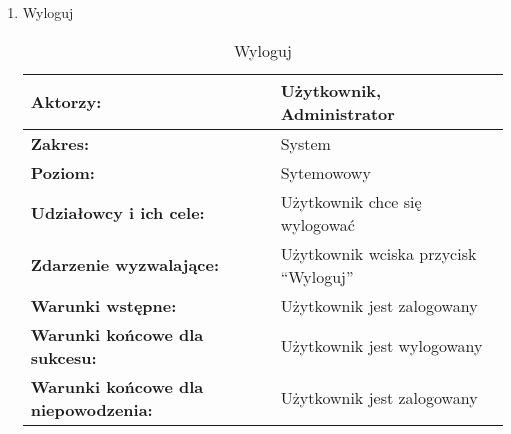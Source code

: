 \begin{enumerate}[label=(\Roman*)]
	\item Wyloguj
	\begin{table}[H]
\centering
\caption{Wyloguj}
\label{wyloguj}
\begin{tabular}{|p{7cm}|p{7cm}|}
  \hline 
  \textbf{Aktorzy:} & Użytkownik, Administrator\\
  \hline
  \textbf{Zakres:} & System \\
	\hline
  \textbf{Poziom:} & Sytemowowy \\
	\hline
  \textbf{Udziałowcy i ich cele: } & Użytkownik chce się wylogować \\
	\hline
  \textbf{Zdarzenie wyzwalające: } & Użytkownik wciska przycisk “Wyloguj” \\
	\hline
  \textbf{Warunki wstępne: } & Użytkownik jest zalogowany
 \\
	\hline
  \textbf{Warunki końcowe dla sukcesu:} & Użytkownik jest wylogowany
 \\
	\hline
  \textbf{Warunki końcowe dla niepowodzenia:} & Użytkownik jest zalogowany \\
  \hline
\end{tabular} 
\end{table}


\end{enumerate}
